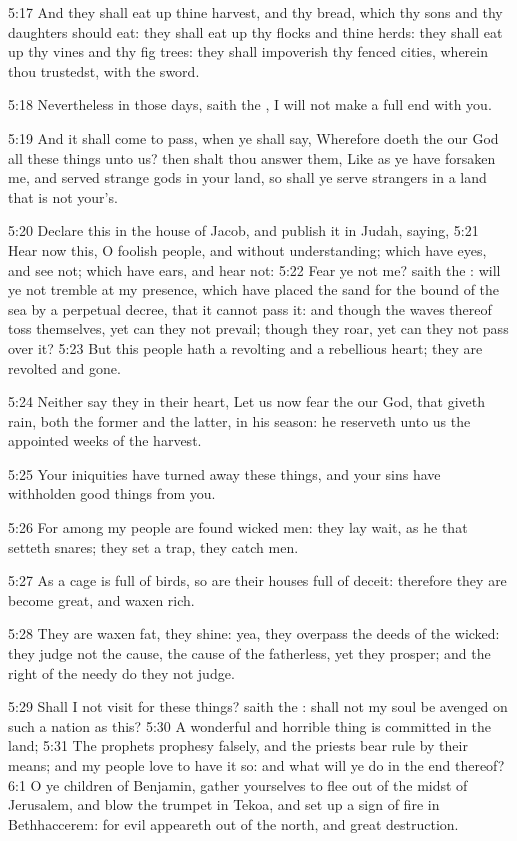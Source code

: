 5:17 And they shall eat up thine harvest, and thy bread, which thy sons and thy daughters should eat: they shall eat up thy flocks and thine herds: they shall eat up thy vines and thy fig trees: they shall impoverish thy fenced cities, wherein thou trustedst, with the sword.

5:18 Nevertheless in those days, saith the \LORD, I will not make a full end with you.

5:19 And it shall come to pass, when ye shall say, Wherefore doeth the \LORD our God all these things unto us? then shalt thou answer them, Like as ye have forsaken me, and served strange gods in your land, so shall ye serve strangers in a land that is not your's.

5:20 Declare this in the house of Jacob, and publish it in Judah, saying, 5:21 Hear now this, O foolish people, and without understanding; which have eyes, and see not; which have ears, and hear not: 5:22 Fear ye not me? saith the \LORD: will ye not tremble at my presence, which have placed the sand for the bound of the sea by a perpetual decree, that it cannot pass it: and though the waves thereof toss themselves, yet can they not prevail; though they roar, yet can they not pass over it?  5:23 But this people hath a revolting and a rebellious heart; they are revolted and gone.

5:24 Neither say they in their heart, Let us now fear the \LORD our God, that giveth rain, both the former and the latter, in his season: he reserveth unto us the appointed weeks of the harvest.

5:25 Your iniquities have turned away these things, and your sins have withholden good things from you.

5:26 For among my people are found wicked men: they lay wait, as he that setteth snares; they set a trap, they catch men.

5:27 As a cage is full of birds, so are their houses full of deceit: therefore they are become great, and waxen rich.

5:28 They are waxen fat, they shine: yea, they overpass the deeds of the wicked: they judge not the cause, the cause of the fatherless, yet they prosper; and the right of the needy do they not judge.

5:29 Shall I not visit for these things? saith the \LORD: shall not my soul be avenged on such a nation as this?  5:30 A wonderful and horrible thing is committed in the land; 5:31 The prophets prophesy falsely, and the priests bear rule by their means; and my people love to have it so: and what will ye do in the end thereof?  6:1 O ye children of Benjamin, gather yourselves to flee out of the midst of Jerusalem, and blow the trumpet in Tekoa, and set up a sign of fire in Bethhaccerem: for evil appeareth out of the north, and great destruction.

